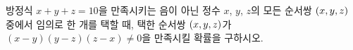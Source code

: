 방정식 $x+y+z=10$을 만족시키는 음이 아닌 정수 $x$, $y$, $z$의 모든 순서쌍 $(x{,}\mkern3mu\mathopen{}y{,}\mkern3mu\mathopen{}z)$ 중에서 임의로 한 개를 택할 때, 택한 순서쌍 $(x{,}\mkern3mu\mathopen{}y{,}\mkern3mu\mathopen{}z)$가 $(x-y)(y-z)(z-x)\ne 0$을 만족시킬 확률을 구하시오.
